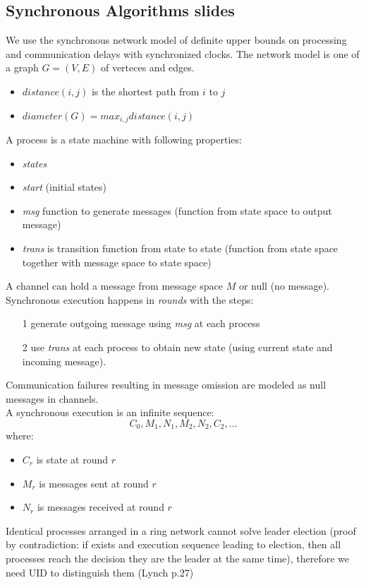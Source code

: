 \documentclass[a4paper,10pt,]{article}
\begin{document}
\subsection{Synchronous Algorithms slides}
We use the synchronous network model of definite upper bounds on processing and communication delays with synchronized clocks.  The network model is one of a graph $G = (V, E)$ of verteces and edges.
\begin{itemize}
  \item $distance(i,j)$ is the shortest path from $i$ to $j$
  \item $diameter(G) = max_{i,j} distance(i,j)$
\end{itemize}
A process is a state machine with following properties:
\begin{itemize}
  \item \emph{states}
  \item \emph{start} (initial states)
  \item \emph{msg} function to generate messages (function from state space to output message)
  \item \emph{trans} is transition function from state to state (function from state space together with message space to state space)
\end{itemize}
A channel can hold a message from message space $M$ or null (no message).\\
Synchronous execution happens in \emph{rounds} with the steps:
\begin{itemize}
  \item[1] generate outgoing message using \emph{msg} at each process
  \item[2] use \emph{trans} at each process to obtain new state (using current state and incoming message).
\end{itemize}
Communication failures resulting in message omission are modeled as null messages in channels.\\
A synchronous execution is an infinite sequence:
$$
C_0, M_1, N_1, M_2, N_2, C_2, \ldots
$$
where:
\begin{itemize}
  \item $C_r$ is state at round $r$
  \item $M_r$ is messages sent at round $r$
  \item $N_r$ is messages received at round $r$
\end{itemize}
Identical processes arranged in a ring network cannot solve leader election (proof by contradiction: if exists and execution sequence leading to election, then all processes reach the decision they are the leader at the same time), therefore we need UID to distinguish them (Lynch p.27)\\
\end{document}
